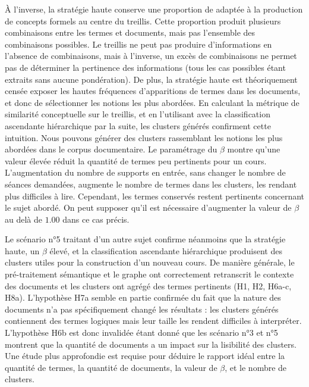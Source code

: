 À l'inverse, la stratégie haute conserve une proportion de  \fg adaptée à la production de concepts formels au centre du treillis.
Cette proportion produit plusieurs combinaisons entre les termes et documents, mais pas l'ensemble des combinaisons possibles.
Le treillis ne peut pas produire d'informations en l'absence de combinaisons, mais à l'inverse, un excès de combinaisons ne permet pas de déterminer la pertinence des informations (tous les cas possibles étant extraits sans aucune pondération).
De plus, la stratégie haute est théoriquement censée exposer les hautes fréquences d'apparitions de termes dans les documents, et donc de sélectionner les notions les plus abordées.
En calculant la métrique de similarité conceptuelle sur le treillis, et en l'utilisant avec la classification ascendante hiérarchique par la suite, les clusters générés confirment cette intuition.
Nous pouvons générer des clusters rassemblant les notions les plus abordées dans le corpus documentaire.
Le paramétrage du $ \beta $ montre qu'une valeur élevée réduit la quantité de termes peu pertinents pour un cours.
L'augmentation du nombre de supports en entrée, sans changer le nombre de séances demandées, augmente le nombre de termes dans les clusters, les rendant plus difficiles à lire.
Cependant, les termes conservés restent pertinents concernant le sujet abordé.
On peut supposer qu'il est nécessaire d'augmenter la valeur de $ \beta $ au delà de $ 1.00 $ dans ce cas précis.

\bigskip

Le scénario n°5 traitant d'un autre sujet confirme néanmoins que la stratégie haute, un $ \beta $ élevé, et la classification ascendante hiérarchique produisent des clusters utiles pour la construction d'un nouveau cours.
De manière générale, le pré-traitement sémantique et le graphe ont correctement retranscrit le contexte des documents et les clusters ont agrégé des termes pertinents (H1, H2, H6a-c, H8a).
L'hypothèse H7a semble en partie confirmée du fait que la nature des documents n'a pas spécifiquement changé les résultats : les clusters générés contiennent des termes logiques mais leur taille les rendent difficiles à interpréter.
L'hypothèse H6b est donc invalidée étant donné que les scénario n°3 et n°5 montrent que la quantité de documents a un impact sur la lisibilité des clusters.
Une étude plus approfondie est requise pour déduire le rapport idéal entre la quantité de termes, la quantité de documents, la valeur de $ \beta $, et le nombre de clusters.

\bigskip

